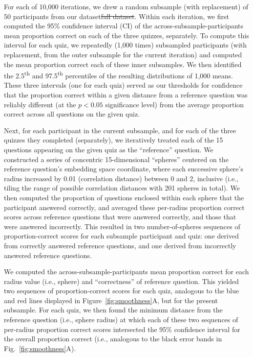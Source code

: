 \documentclass[10pt]{article}
\providecommand{\DIFaddtex}[1]{{\protect\color{blue}\uwave{#1}}} %
\providecommand{\DIFdeltex}[1]{{\protect\color{red}\sout{#1}}}                      %
\providecommand{\DIFaddbegin}{} %
\providecommand{\DIFaddend}{} %
\providecommand{\DIFdelbegin}{} %
\providecommand{\DIFdelend}{} %
\providecommand{\DIFadd}[1]{\texorpdfstring{\DIFaddtex{#1}}{#1}} %
\providecommand{\DIFdel}[1]{\texorpdfstring{\DIFdeltex{#1}}{}} %
\newcommand{\DIFscaledelfig}{0.5}
\newlength{\DIFdelgraphicswidth} %
\newlength{\DIFdelgraphicsheight} %
\newcommand{\DIFaddincludegraphics}[2][]{{\color{blue}\fbox{\DIFOincludegraphics[#1]{#2}}}} %
\newcommand{\DIFdelincludegraphics}[2][]{%
\sbox{\DIFdelgraphicsbox}{\DIFOincludegraphics[#1]{#2}}%
\settoboxwidth{\DIFdelgraphicswidth}{\DIFdelgraphicsbox} %
\settoboxtotalheight{\DIFdelgraphicsheight}{\DIFdelgraphicsbox} %
\scalebox{\DIFscaledelfig}{%
\parbox[b]{\DIFdelgraphicswidth}{\usebox{\DIFdelgraphicsbox}\\[-\baselineskip] \rule{\DIFdelgraphicswidth}{0em}}\llap{\resizebox{\DIFdelgraphicswidth}{\DIFdelgraphicsheight}{%
\setlength{\unitlength}{\DIFdelgraphicswidth}%
\begin{picture}(1,1)%
\thicklines\linethickness{2pt} %
{\color[rgb]{1,0,0}\put(0,0){\framebox(1,1){}}}%
{\color[rgb]{1,0,0}\put(0,0){\line( 1,1){1}}}%
{\color[rgb]{1,0,0}\put(0,1){\line(1,-1){1}}}%
\end{picture}%
}\hspace*{3pt}}} %
} %
\DeclareRobustCommand{\DIFaddbegin}{\DIFOaddbegin \let\includegraphics\DIFaddincludegraphics} %
\DeclareRobustCommand{\DIFaddend}{\DIFOaddend \let\includegraphics\DIFOincludegraphics} %
\DeclareRobustCommand{\DIFdelbegin}{\DIFOdelbegin \let\includegraphics\DIFdelincludegraphics} %
\DeclareRobustCommand{\DIFdelend}{\DIFOaddend \let\includegraphics\DIFOincludegraphics} %
\begin{document}
For each of 10,000 iterations, we drew a random subsample (with replacement) of
50 participants from our dataset\DIFdelbegin \DIFdel{full dataset}\DIFdelend . Within each iteration, we first computed the
95\% confidence interval (CI) of the across-subsample-participants mean
proportion correct on each of the three quizzes, separately. To compute this
interval for each quiz, we repeatedly (1,000 times) subsampled participants
(with replacement, from the outer subsample for the current iteration) and
computed the mean proportion correct \DIFaddbegin \DIFadd{of }\DIFaddend each of these inner subsamples. We then
identified the 2.5\textsuperscript{th} and 97.5\textsuperscript{th} percentiles
of the resulting distributions of 1,000 means. These three intervals (one for
each quiz) served as our thresholds for confidence that the proportion correct
within a given distance from a reference question was reliably different (at
the $p < 0.05$ significance level) from the average proportion correct across
all questions on the given quiz.

Next, for each participant in the current subsample, and for each of the three
quizzes they completed (separately), we iteratively treated each of the 15
questions appearing on the given quiz as the ``reference'' question. We
constructed a series of concentric 15-dimensional ``spheres'' centered on the
reference question's embedding space coordinate, where each successive sphere's
radius increased by 0.01 (correlation distance) between 0 and 2, inclusive
(i.e., tiling the range of possible correlation distances with 201 spheres in
total). We then computed the proportion of questions enclosed within each
sphere that the participant answered correctly, and averaged these per-radius
proportion correct scores across reference questions that were answered
correctly, and those that were answered incorrectly. This resulted in two
number-of-spheres sequences of proportion-correct scores for each subsample
participant and quiz: one derived from correctly answered reference questions,
and one derived from incorrectly answered reference questions.

We computed the across-subsample-participants mean proportion correct for each
radius value (i.e., sphere) and ``correctness'' of reference question. This
yielded two sequences of proportion-correct scores for each quiz, analogous to
the blue and red lines displayed in Figure~\ref{fig:smoothness}A, but for the
present subsample. For each quiz, we then found the minimum distance from the
reference question (i.e., sphere radius) at which each of these two sequences
of per-radius proportion correct scores intersected the 95\% confidence
interval for the overall proportion correct (i.e., analogous to the black error
bands in Fig.~\ref{fig:smoothness}A).
\end{document}
